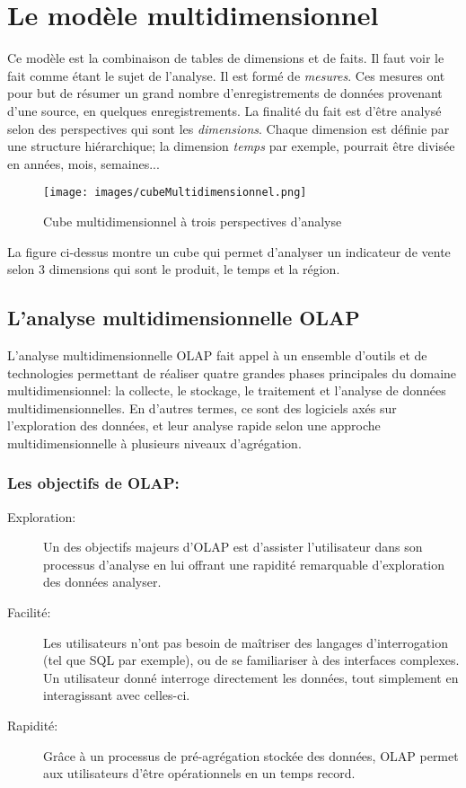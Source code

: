 \documentclass[12pt,a4wide,twoside]{report}
\begin{document}
\section{Le modèle multidimensionnel}
Ce modèle est la combinaison de tables de dimensions et de faits. Il faut voir le fait comme étant le sujet de l'analyse. Il est formé de \emph{mesures}. Ces mesures ont pour but de résumer un grand nombre d'enregistrements de données provenant d'une source, en quelques enregistrements.\newline
La finalité du fait est d'être analysé selon des perspectives qui sont les \emph{dimensions}. Chaque dimension est définie par une structure hiérarchique; la dimension \emph{temps} par exemple, pourrait être divisée en années, mois, semaines...
\begin{figure}[!h]
\begin{center}
			\texttt{[image: images/cubeMultidimensionnel.png]}
\end{center}
\caption{Cube multidimensionnel à trois perspectives d'analyse}
\end{figure}
\newline
La figure ci-dessus montre un cube qui permet d'analyser un indicateur de vente selon 3 dimensions qui sont le produit, le temps et la région.
\subsection{L'analyse multidimensionnelle OLAP}
L'analyse multidimensionnelle OLAP fait appel à un ensemble d'outils et de technologies permettant de réaliser quatre grandes phases principales du domaine multidimensionnel: la collecte, le stockage, le traitement et l'analyse de données multidimensionnelles. \newline
En d'autres termes, ce sont des logiciels axés sur l'exploration des données, et leur analyse rapide selon une approche multidimensionnelle à plusieurs niveaux d'agrégation. \newline
\subsubsection{Les objectifs de OLAP:}
\begin{description}
	\item[Exploration:]
	Un des objectifs majeurs d'OLAP est d'assister l'utilisateur dans son processus d'analyse en lui offrant une rapidité remarquable d'exploration des données analyser.
	\item[Facilité:]
	Les utilisateurs n'ont pas besoin de maîtriser des langages d'interrogation (tel que SQL par exemple), ou de se familiariser à des interfaces complexes. Un utilisateur donné interroge directement les données, tout simplement en interagissant avec celles-ci. 
	\item[Rapidité:] 
Grâce à un processus de pré-agrégation stockée des données, OLAP permet aux utilisateurs d'être opérationnels en un temps record.
\end{description}
\end{document}
